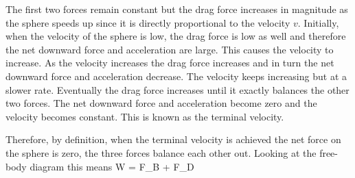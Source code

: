    The first two forces remain constant but the drag force increases in magnitude as the sphere speeds up since it is directly proportional to the velocity $v$. Initially, when the velocity of the sphere is low, the drag force is low as well and therefore the net downward force and acceleration are large. This causes the velocity to increase. As the velocity increases the drag force increases and in turn the net downward force and acceleration decrease. The velocity keeps increasing but at a slower rate. Eventually the drag force increases until it exactly balances the other two forces. The net downward force and acceleration become zero and the velocity becomes constant. This is known as the terminal velocity.

   Therefore, by definition, when the terminal velocity is achieved the net force on the sphere is zero, the three forces balance each other out. Looking at the free-body diagram this means
   \beq
      W = F_B + F_D
   \eeq
